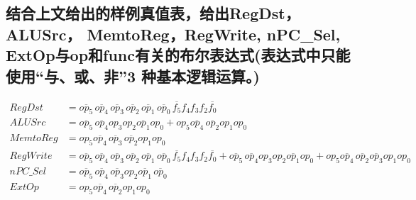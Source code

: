\documentclass[UTF8]{ctexart}
\begin{document}
\subsection{结合上文给出的样例真值表，给出RegDst， ALUSrc， MemtoReg，RegWrite, nPC\_Sel, ExtOp与op和func有关的布尔表达式(表达式中只能使用“与、或、非”3 种基本逻辑运算。)}
\begin{equation*}
	\begin{aligned}
		RegDst   & =\overline{op_5}\,\overline{op_4}\,\overline{op_3}\,\overline{op_2}\,\overline{op_1}\,\overline{op_0}\,\overline{f_5}f_4f_3f_2\overline{f_0}                                                                                                                         \\
		ALUSrc   & =\overline{op_5}\,\overline{op_4}op_3op_2\overline{op_1}op_0+op_5\overline{op_4}\,\overline{op_2}op_1op_0                                                                                                                                                            \\
		MemtoReg & =op_5\overline{op_4}\,\overline{op_3}\,\overline{op_2}op_1op_0                                                                                                                                                                                                       \\
		RegWrite & =\overline{op_5}\,\overline{op_4}\,\overline{op_3}\,\overline{op_2}\,\overline{op_1}\,\overline{op_0}\,\overline{f_5}f_4f_3f_2\overline{f_0}+\overline{op_5}\,\overline{op_4}op_3op_2\overline{op_1}op_0+op_5\overline{op_4}\,\overline{op_2}\overline{op_3}op_1op_0 \\
		nPC\_Sel & =\overline{op_5}\,\overline{op_4}\,\overline{op_3}op_2\overline{op_1}\,\overline{op_0}                                                                                                                                                                               \\
		ExtOp    & =op_5\overline{op_4}\,\overline{op_2}op_1op_0                                                                                                                                                                                                                        \\
	\end{aligned}
\end{equation*}
\end{document}
